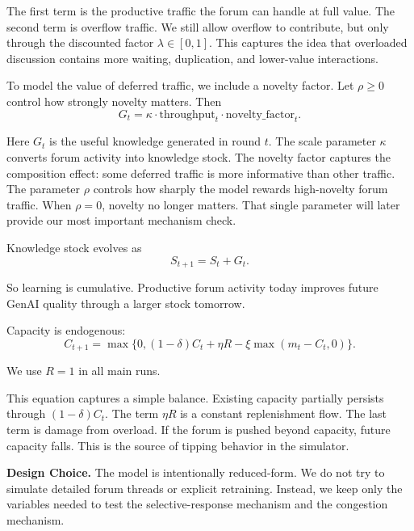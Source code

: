 \documentclass{article}
\newenvironment{designchoice}
  {\begin{framed}\noindent\textbf{Design Choice. }}
  {\end{framed}}
\begin{document}
The first term is the productive traffic the forum can handle at full value. The second term is overflow traffic. We still allow overflow to contribute, but only through the discounted factor $\lambda \in [0,1]$. This captures the idea that overloaded discussion contains more waiting, duplication, and lower-value interactions.

To model the value of deferred traffic, we include a novelty factor. Let $\rho \ge 0$ control how strongly novelty matters. Then
\begin{equation}
G_t = \kappa \cdot \text{throughput}_t \cdot \text{novelty\_factor}_t.
\end{equation}

Here $G_t$ is the useful knowledge generated in round $t$. The scale parameter $\kappa$ converts forum activity into knowledge stock. The novelty factor captures the composition effect: some deferred traffic is more informative than other traffic. The parameter $\rho$ controls how sharply the model rewards high-novelty forum traffic. When $\rho=0$, novelty no longer matters. That single parameter will later provide our most important mechanism check.

Knowledge stock evolves as
\begin{equation}
S_{t+1} = S_t + G_t.
\end{equation}

So learning is cumulative. Productive forum activity today improves future GenAI quality through a larger stock tomorrow.

Capacity is endogenous:
\begin{equation}
C_{t+1} = \max\{0,(1-\delta)C_t + \eta R - \xi \max(m_t-C_t,0)\}.
\end{equation}

We use $R=1$ in all main runs.

This equation captures a simple balance. Existing capacity partially persists through $(1-\delta)C_t$. The term $\eta R$ is a constant replenishment flow. The last term is damage from overload. If the forum is pushed beyond capacity, future capacity falls. This is the source of tipping behavior in the simulator.

\begin{designchoice}
The model is intentionally reduced-form. We do not try to simulate detailed forum threads or explicit retraining. Instead, we keep only the variables needed to test the selective-response mechanism and the congestion mechanism.
\end{designchoice}
\end{document}

